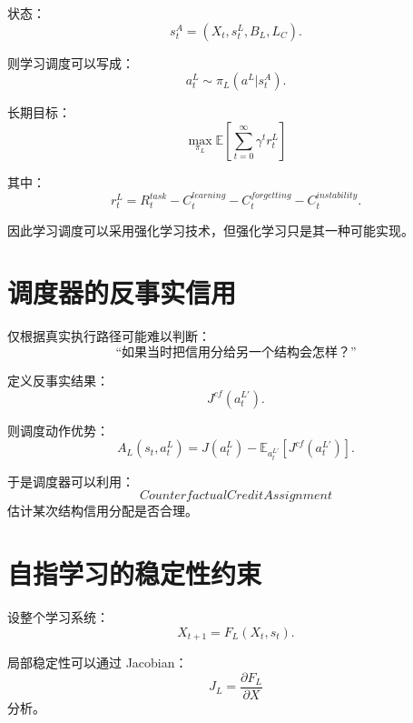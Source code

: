 状态：
\begin{equation}
s_t^A
=
(
X_t,
s_t^L,
B_L,
L_C
).
\end{equation}

则学习调度可以写成：
\begin{equation}
a_t^L
\sim
\pi_L(
a^L|s_t^A
).
\end{equation}

长期目标：
\begin{equation}
\boxed{
\max_{\pi_L}
\mathbb{E}
\left[
\sum_{t=0}^{\infty}
\gamma^t
r_t^L
\right]
}
\end{equation}

其中：
\begin{equation}
r_t^L
=
R_t^{task}
-
C_t^{learning}
-
C_t^{forgetting}
-
C_t^{instability}.
\end{equation}

因此学习调度可以采用强化学习技术，但强化学习只是其一种可能实现。


\section{调度器的反事实信用}

仅根据真实执行路径可能难以判断：
\begin{equation}
\text{“如果当时把信用分给另一个结构会怎样？”}
\end{equation}

定义反事实结果：
\begin{equation}
J^{cf}
(
a_t^{L'}
).
\end{equation}

则调度动作优势：
\begin{equation}
A_L(
s_t,
a_t^L
)
=
J(
a_t^L
)
-
\mathbb{E}_{a_t^{L'}}
[
J^{cf}(a_t^{L'})
].
\end{equation}

于是调度器可以利用：
\begin{equation}
\boxed{
CounterfactualCreditAssignment
}
\end{equation}
估计某次结构信用分配是否合理。


\section{自指学习的稳定性约束}

设整个学习系统：
\begin{equation}
X_{t+1}
=
F_L(
X_t,s_t
).
\end{equation}

局部稳定性可以通过 Jacobian：
\begin{equation}
J_L
=
\frac{\partial F_L}
{\partial X}
\end{equation}
分析。

